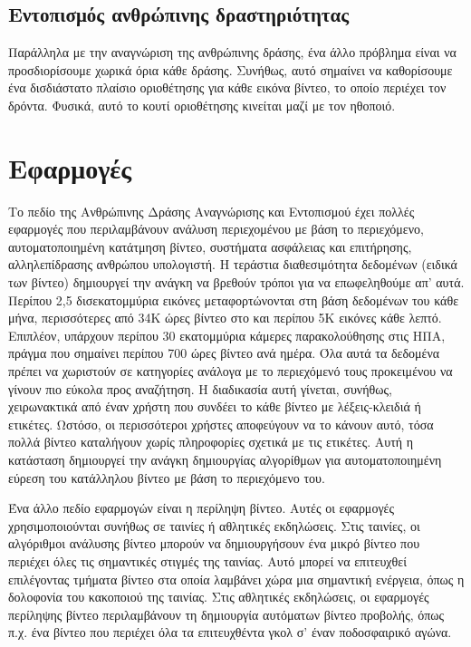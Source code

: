 \subsection{Εντοπισμός ανθρώπινης δραστηριότητας}
Παράλληλα με την αναγνώριση της ανθρώπινης δράσης, ένα άλλο πρόβλημα είναι να προσδιορίσουμε χωρικά όρια κάθε δράσης. Συνήθως, αυτό σημαίνει
να καθορίσουμε  ένα δισδιάστατο πλαίσιο οριοθέτησης για κάθε εικόνα βίντεο, το οποίο περιέχει τον δρόντα. Φυσικά, αυτό το κουτί οριοθέτησης κινείται μαζί με
τον ηθοποιό.

\section{Εφαρμογές}
Το πεδίο της Ανθρώπινης Δράσης Αναγνώρισης και Εντοπισμού έχει πολλές εφαρμογές που περιλαμβάνουν
  ανάλυση περιεχομένου με βάση το περιεχόμενο, αυτοματοποιημένη κατάτμηση βίντεο, συστήματα ασφάλειας και επιτήρησης,
αλληλεπίδρασης ανθρώπου υπολογιστή.
Η τεράστια διαθεσιμότητα δεδομένων (ειδικά των βίντεο) δημιουργεί την ανάγκη να βρεθούν τρόποι για να επωφεληθούμε απ' αυτά.
Περίπου 2,5 δισεκατομμύρια εικόνες μεταφορτώνονται στη βάση δεδομένων του  κάθε μήνα, περισσότερες από 34K ώρες βίντεο στο  και 
περίπου 5K εικόνες κάθε λεπτό. Επιπλέον, υπάρχουν περίπου 30 εκατομμύρια κάμερες παρακολούθησης στις ΗΠΑ, πράγμα που σημαίνει
περίπου 700 ώρες βίντεο ανά ημέρα. Όλα αυτά τα δεδομένα πρέπει να χωριστούν σε κατηγορίες ανάλογα με το περιεχόμενό τους
προκειμένου να γίνουν πιο εύκολα προς αναζήτηση. Η διαδικασία αυτή γίνεται, συνήθως, χειρωνακτικά από έναν χρήστη που συνδέει το κάθε βίντεο με 
λέξεις-κλειδιά ή ετικέτες. Ωστόσο, οι περισσότεροι χρήστες αποφεύγουν να το κάνουν αυτό, τόσα πολλά βίντεο καταλήγουν χωρίς πληροφορίες σχετικά με τις ετικέτες.
Αυτή η κατάσταση δημιουργεί την ανάγκη δημιουργίας αλγορίθμων για αυτοματοποιημένη εύρεση του κατάλληλου βίντεο με βάση το περιεχόμενο του.

Ένα άλλο πεδίο εφαρμογών είναι η περίληψη βίντεο. Αυτές οι εφαρμογές χρησιμοποιούνται συνήθως σε ταινίες ή αθλητικές εκδηλώσεις. Στις ταινίες,
οι αλγόριθμοι ανάλυσης βίντεο μπορούν να δημιουργήσουν ένα μικρό βίντεο που περιέχει όλες τις σημαντικές στιγμές της ταινίας. Αυτό
μπορεί να επιτευχθεί επιλέγοντας τμήματα βίντεο στα οποία λαμβάνει χώρα μια σημαντική ενέργεια, όπως η δολοφονία του κακοποιού
της ταινίας. Στις αθλητικές εκδηλώσεις, οι εφαρμογές περίληψης βίντεο  περιλαμβάνουν τη δημιουργία αυτόματων βίντεο προβολής, όπως π.χ.
ένα βίντεο που περιέχει όλα τα επιτευχθέντα γκολ σ' έναν ποδοσφαιρικό αγώνα.

